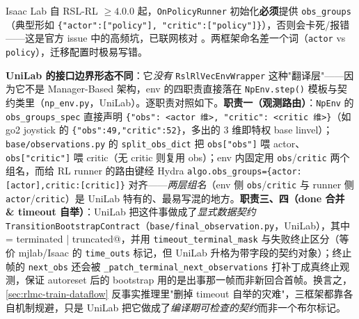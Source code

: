 \begin{note}
Isaac Lab 自 RSL-RL $\ge4.0.0$ 起，\verb|OnPolicyRunner| 初始化\textbf{必须}提供 \verb|obs_groups|（典型形如 \verb|{"actor":["policy"], "critic":["policy"]}|），否则会卡死/报错——这是官方 issue 中的高频坑，已联网核对 \cite{schwarke2025rslrl}。两框架命名差一个词（\verb|actor| vs \verb|policy|），迁移配置时极易写错。
\end{note}

\textbf{UniLab 的接口边界形态不同}：它\emph{没有} \verb|RslRlVecEnvWrapper| 这种"翻译层"——因为它不是 Manager-Based 架构，env 的四职责直接落在 \verb|NpEnv.step()| 模板与契约类里（\verb|np_env.py|，UniLab）。逐职责对照如下。\textbf{职责一（观测路由）}：\verb|NpEnv| 的 \verb|obs_groups_spec| 直接声明 \verb|{"obs": <actor 维>, "critic": <critic 维>}|（如 go2 joystick 的 \verb|{"obs":49,"critic":52}|，多出的 $3$ 维即特权 base linvel）；\verb|base/observations.py| 的 \verb|split_obs_dict| 把 \verb|obs["obs"]| 喂 actor、\verb|obs["critic"]| 喂 critic（无 critic 则复用 obs）；env 内固定用 \verb|obs|/\verb|critic| 两个组名，而给 RL runner 的路由键经 Hydra \verb|algo.obs_groups={actor:[actor],critic:[critic]}| 对齐——\emph{两层组名}（env 侧 \verb|obs|/\verb|critic| 与 runner 侧 \verb|actor|/\verb|critic|）是 UniLab 特有的、最易写混的地方。\textbf{职责三、四（done 合并 \& timeout 自举）}：UniLab 把这件事做成了\emph{显式数据契约} \verb|TransitionBootstrapContract|（\verb|base/final_observation.py|，UniLab），其中 \verb@done = terminated | truncated@，并用 \verb|timeout_terminal_mask| 与失败终止区分（等价 mjlab/Isaac 的 \verb|time_outs| 标记，但 UniLab 升格为带字段的契约对象）；终止帧的 \verb|next_obs| 还会被 \verb|_patch_terminal_next_observations| 打补丁成真终止观测，保证 autoreset 后的 bootstrap 用的是出事那一帧而非新回合首帧。换言之，\cref{sec:rlmc-train-dataflow} 反事实推理里"删掉 timeout 自举的灾难"，三框架都靠各自机制规避，只是 UniLab 把它做成了\emph{编译期可检查的契约}而非一个布尔标记。

